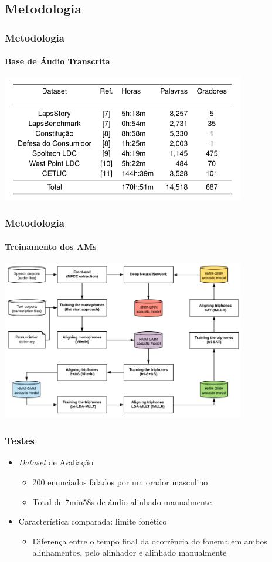 \subsection{Metodologia}
\begin{frame}
    \frametitle{Metodologia}
    \framesubtitle{Base de \'Audio Transcrita}
    \begin{center}
        \includegraphics[width=0.8\textwidth]{Figures/db}
    \end{center}
\end{frame}

\begin{frame}
    \frametitle{Metodologia}
    \framesubtitle{Treinamento dos AMs}
    \begin{center}
        \includegraphics[width=0.8\textwidth]{Figures/training}
    \end{center}
\end{frame}

\begin{frame}
    \frametitle{Testes}
    \begin{itemize}
        \item \textit{Dataset} de Avalia\c c\~ao
        \begin{itemize}
            \item 200 enunciados falados por um orador masculino
            \item Total de 7min58s de \'audio alinhado manualmente
        \end{itemize}
        \item Caracter\'istica comparada: limite fon\'etico
        \begin{itemize}
            \item Diferen\c ca entre o tempo final da ocorrência do fonema em ambos alinhamentos, pelo alinhador e alinhado manualmente
        \end{itemize}
    \end{itemize}
\end{frame}
